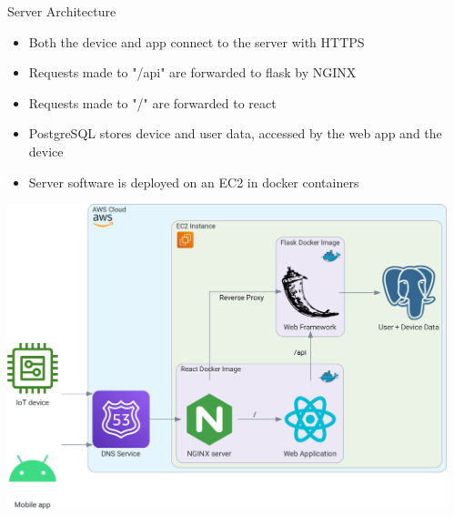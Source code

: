 \documentclass[final, cmyk]{beamer}
\newlength{\sepwidth}
\newlength{\colwidth}
\newcommand{\separatorcolumn}{\begin{column}{\sepwidth}\end{column}}
\begin{document}
\begin{frame}[t]
\begin{columns}[t]
\begin{column}{\colwidth}
      \begin{block}{Server Architecture}
        \begin{itemize}
          \item Both the device and app connect to the server with HTTPS
          \item Requests made to "/api" are forwarded to flask by NGINX
          \item Requests made to "/" are forwarded to react
          \item PostgreSQL stores device and user data, accessed by the web app
            and the device
          \item Server software is deployed on an EC2 in docker containers
        \end{itemize}

        \vskip 0.5cm
        \begin{center}
          \includegraphics[width = 0.95 \textwidth]{data_flow.png}
        \end{center}
      \end{block}

    \end{column}
    \separatorcolumn

  \end{columns}


\end{frame}
\end{document}

